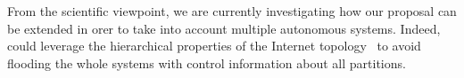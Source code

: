From the scientific viewpoint, we are currently investigating how our
proposal can be extended in orer to take into account multiple
autonomous systems. Indeed, \processes could leverage the hierarchical
properties of the Internet topology~\cite{nur2018geography} to avoid
flooding the whole systems with control information about all
partitions.



